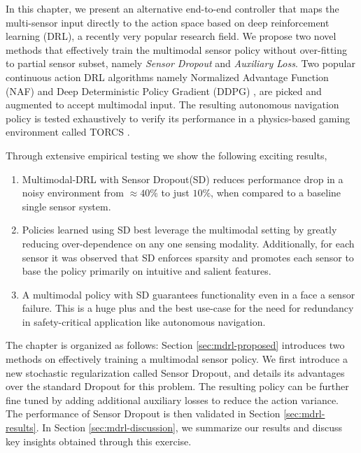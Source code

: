 \documentclass[../thesis.tex]{subfiles}
\begin{document}
In this chapter, we present an alternative end-to-end controller that maps the multi-sensor input directly to the action space based on deep reinforcement learning (DRL), a recently very popular research field. 
We propose two novel methods that effectively train the multimodal sensor policy without over-fitting to partial sensor subset, namely \textit{Sensor Dropout} and \textit{Auxiliary Loss}. 
Two popular continuous action DRL algorithms namely Normalized Advantage Function (NAF) \cite{CDQN} and Deep Deterministic Policy Gradient (DDPG) \cite{DBLP:journals/corr/LillicrapHPHETS15}, are picked and augmented to accept multimodal input. The resulting autonomous navigation policy is tested exhaustively to verify its performance in a physics-based gaming environment called TORCS \cite{wymann2000torcs}. 

Through extensive empirical testing we show the following exciting results,
\begin{enumerate}

	\item Multimodal-DRL with Sensor Dropout(SD) reduces performance drop in a noisy environment from $\approx 40\%$ to just $10\%$, when compared to a baseline single sensor system.
	
	\item Policies learned using SD best leverage the multimodal setting by greatly reducing over-dependence on any one sensing modality. Additionally, for each sensor it was observed that SD enforces sparsity and promotes each sensor to base the policy primarily on intuitive and salient features.
	
	\item A multimodal policy with SD guarantees functionality even in a face a sensor failure. This is a huge plus and the best use-case for the need for redundancy in safety-critical application like autonomous navigation.

\end{enumerate}


The chapter is organized as follows: 
Section \ref{sec:mdrl-proposed} introduces two methods on effectively training a multimodal sensor policy. We first introduce a new stochastic regularization called Sensor Dropout, and details its advantages over the standard Dropout for this problem. The resulting policy can be further fine tuned by adding additional auxiliary losses to reduce the action variance. The performance of Sensor Dropout is then validated in Section \ref{sec:mdrl-results}. In Section \ref{sec:mdrl-discussion}, we summarize our results and discuss key insights obtained through this exercise. 
\end{document}
